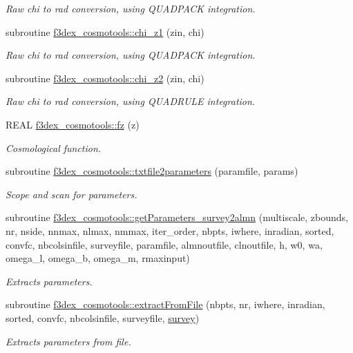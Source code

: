 \begin{DoxyCompactItemize}
\begin{DoxyCompactList}\small\item\em Raw chi to rad conversion, using QUADPACK integration. \end{DoxyCompactList}\item 
subroutine \hyperlink{namespacef3dex__cosmotools_aae4fa92003adf2bfde48fa0dfcbf6b51}{f3dex\_\-cosmotools::chi\_\-z1} (zin, chi)
\begin{DoxyCompactList}\small\item\em Raw chi to rad conversion, using QUADPACK integration. \end{DoxyCompactList}\item 
subroutine \hyperlink{namespacef3dex__cosmotools_a6c29a874ae95da9fb207a2f63729eecf}{f3dex\_\-cosmotools::chi\_\-z2} (zin, chi)
\begin{DoxyCompactList}\small\item\em Raw chi to rad conversion, using QUADRULE integration. \end{DoxyCompactList}\item 
REAL \hyperlink{namespacef3dex__cosmotools_abba0e9b02d0f46a5abce5a0830da7f4d}{f3dex\_\-cosmotools::fz} (z)
\begin{DoxyCompactList}\small\item\em Cosmological function. \end{DoxyCompactList}\item 
subroutine \hyperlink{namespacef3dex__cosmotools_a609d3f29da9fc1be3bf27757e25532eb}{f3dex\_\-cosmotools::txtfile2parameters} (paramfile, params)
\begin{DoxyCompactList}\small\item\em Scope and scan for parameters. \end{DoxyCompactList}\item 
subroutine \hyperlink{namespacef3dex__cosmotools_a8405dbd12e86a408520f40f1b0a68919}{f3dex\_\-cosmotools::getParameters\_\-survey2almn} (multiscale, zbounds, nr, nside, nnmax, nlmax, nmmax, iter\_\-order, nbpts, iwhere, inradian, sorted, convfc, nbcolsinfile, surveyfile, paramfile, almnoutfile, clnoutfile, h, w0, wa, omega\_\-l, omega\_\-b, omega\_\-m, rmaxinput)
\begin{DoxyCompactList}\small\item\em Extracts parameters. \end{DoxyCompactList}\item 
subroutine \hyperlink{namespacef3dex__cosmotools_aaef3c07f112a83e6ff7a2762d5202fae}{f3dex\_\-cosmotools::extractFromFile} (nbpts, nr, iwhere, inradian, sorted, convfc, nbcolsinfile, surveyfile, \hyperlink{modulesurvey}{survey})
\begin{DoxyCompactList}\small\item\em Extracts parameters from file. \end{DoxyCompactList}\end{DoxyCompactItemize}
